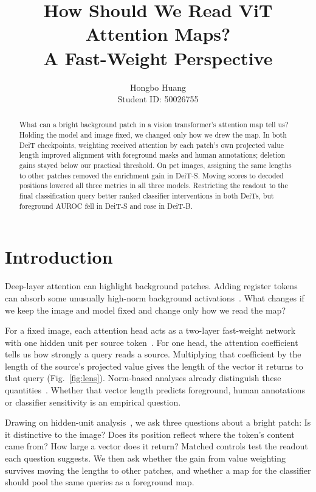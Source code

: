 \documentclass{article}
\title{How Should We Read ViT Attention Maps?\\A Fast-Weight Perspective}
\author{Hongbo Huang\\Student ID: 50026755}
\begin{document}
\raggedbottom
\maketitle
\begin{abstract}
What can a bright background patch in a vision transformer's attention map tell us? Holding the model and image fixed, we changed only how we drew the map. In both DeiT checkpoints, weighting received attention by each patch's own projected value length improved alignment with foreground masks and human annotations; deletion gains stayed below our practical threshold. On pet images, assigning the same lengths to other patches removed the enrichment gain in DeiT-S. Moving scores to decoded positions lowered all three metrics in all three models. Restricting the readout to the final classification query better ranked classifier interventions in both DeiTs, but foreground AUROC fell in DeiT-S and rose in DeiT-B.
\end{abstract}

\section{Introduction}
Deep-layer attention can highlight background patches. Adding register tokens can absorb some unusually high-norm background activations~\citep{darcet2024}. What changes if we keep the image and model fixed and change only how we read the map?

For a fixed image, each attention head acts as a two-layer fast-weight network with one hidden unit per source token~\citep{wen2026mita}. For one head, the attention coefficient tells us how strongly a query reads a source. Multiplying that coefficient by the length of the source's projected value gives the length of the vector it returns to that query (Fig.~\ref{fig:lens}). Norm-based analyses already distinguish these quantities~\citep{kobayashi2020,zhu2024}. Whether that vector length predicts foreground, human annotations or classifier sensitivity is an empirical question.

Drawing on hidden-unit analysis~\citep{bau2017}, we ask three questions about a bright patch: Is it distinctive to the image? Does its position reflect where the token's content came from? How large a vector does it return? Matched controls test the readout each question suggests. We then ask whether the gain from value weighting survives moving the lengths to other patches, and whether a map for the classifier should pool the same queries as a foreground map.
\end{document}
